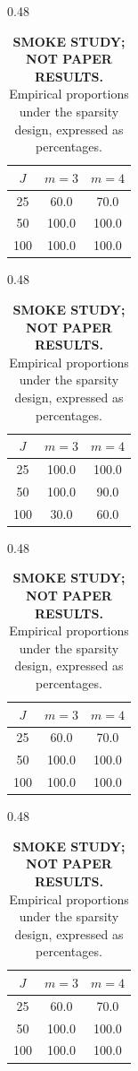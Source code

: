 \begin{table}[htbp]
\centering
\begin{subtable}[t]{0.48\textwidth}
\centering
\begin{tabular}{c cc}
\toprule
\(J\) & \(m=3\) & \(m=4\)\\
\midrule
25 & 60.0 & 70.0\\
50 & 100.0 & 100.0\\
100 & 100.0 & 100.0\\
\bottomrule
\end{tabular}
\caption{\(\widehat{\P}(I_{\mathrm{id}}=1)\).}
\end{subtable}
\hfill
\begin{subtable}[t]{0.48\textwidth}
\centering
\begin{tabular}{c cc}
\toprule
\(J\) & \(m=3\) & \(m=4\)\\
\midrule
25 & 100.0 & 100.0\\
50 & 100.0 & 90.0\\
100 & 30.0 & 60.0\\
\bottomrule
\end{tabular}
\caption{\(\widehat{\P}(I_{\mathrm{comp}}=0\mid I_{\mathrm{id}}=1)\).}
\end{subtable}

\vspace{0.8em}

\begin{subtable}[t]{0.48\textwidth}
\centering
\begin{tabular}{c cc}
\toprule
\(J\) & \(m=3\) & \(m=4\)\\
\midrule
25 & 60.0 & 70.0\\
50 & 100.0 & 100.0\\
100 & 100.0 & 100.0\\
\bottomrule
\end{tabular}
\caption{\(\widehat{\P}(I_{\mathrm{2c}}=1)\).}
\end{subtable}
\hfill
\begin{subtable}[t]{0.48\textwidth}
\centering
\begin{tabular}{c cc}
\toprule
\(J\) & \(m=3\) & \(m=4\)\\
\midrule
25 & 60.0 & 70.0\\
50 & 100.0 & 100.0\\
100 & 100.0 & 100.0\\
\bottomrule
\end{tabular}
\caption{\(\widehat{\P}(I_{\mathrm{3c}}=1)\).}
\end{subtable}
\caption{\textbf{SMOKE STUDY; NOT PAPER RESULTS.} Empirical proportions under the sparsity design, expressed as percentages.}
\label{tab:sparse}
\end{table}

